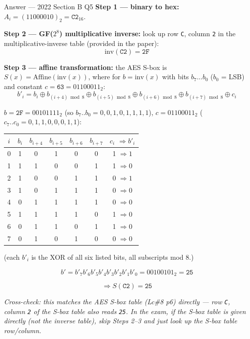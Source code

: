 \documentclass[12pt,a4paper]{article}
\begin{document}
\begin{solbox}{Answer --- 2022 Section B Q5}
\textbf{Step 1 --- binary to hex:} $A_i=(11000010)_2 = \texttt{C2}_{16}$.

\textbf{Step 2 --- GF($2^8$) multiplicative inverse:} look up row \texttt{C}, column \texttt{2} in the multiplicative-inverse table (provided in the paper):
\[
\text{inv}(\texttt{C2}) = \texttt{2F}
\]

\textbf{Step 3 --- affine transformation:} the AES S-box is $S(x) = \text{Affine}(\text{inv}(x))$, where for $b=\text{inv}(x)$ with bits $b_7\ldots b_0$ ($b_0$ = LSB) and constant $c=\texttt{63}=01100011_2$:
\[
b'_i = b_i \oplus b_{(i+4)\bmod 8} \oplus b_{(i+5)\bmod 8} \oplus b_{(i+6)\bmod 8} \oplus b_{(i+7)\bmod 8} \oplus c_i
\]

$b=\texttt{2F}=00101111_2$ (so $b_7..b_0 = 0,0,1,0,1,1,1,1$), $c=01100011_2$ ($c_7..c_0=0,1,1,0,0,0,1,1$):

\renewcommand{\arraystretch}{1.15}
\begin{center}
\begin{tabular}{ccccccc}
\toprule
$i$ & $b_i$ & $b_{i+4}$ & $b_{i+5}$ & $b_{i+6}$ & $b_{i+7}$ & $c_i$ \quad$\Rightarrow b'_i$\\
\midrule
0 & 1 & 0 & 1 & 0 & 0 & 1 $\Rightarrow 1$\\
1 & 1 & 1 & 0 & 0 & 1 & 1 $\Rightarrow 0$\\
2 & 1 & 0 & 0 & 1 & 1 & 0 $\Rightarrow 1$\\
3 & 1 & 0 & 1 & 1 & 1 & 0 $\Rightarrow 0$\\
4 & 0 & 1 & 1 & 1 & 1 & 0 $\Rightarrow 0$\\
5 & 1 & 1 & 1 & 1 & 0 & 1 $\Rightarrow 0$\\
6 & 0 & 1 & 1 & 0 & 1 & 1 $\Rightarrow 0$\\
7 & 0 & 1 & 0 & 1 & 0 & 0 $\Rightarrow 0$\\
\bottomrule
\end{tabular}
\end{center}

(each $b'_i$ is the XOR of all six listed bits, all subscripts mod 8.)

\[
b' = b'_7b'_6b'_5b'_4b'_3b'_2b'_1b'_0 = 00100101_2 = \boxed{\texttt{25}}
\]

\[
\Rightarrow S(\texttt{C2}) = \boxed{\texttt{25}}
\]

\textit{Cross-check: this matches the AES S-box table (Lc\#8 p6) directly --- row \texttt{C}, column \texttt{2} of the S-box table also reads \texttt{25}. In the exam, if the S-box table is given directly (not the inverse table), skip Steps 2--3 and just look up the S-box table row/column.}
\end{solbox}
\end{document}

